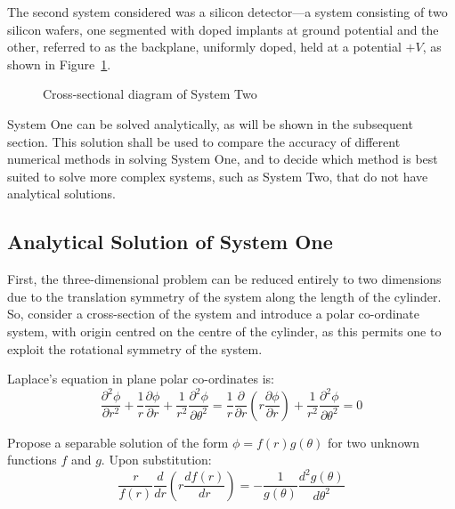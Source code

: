\documentclass[11pt, a4paper]{article}
\newcommand{\be}{\begin{equation}}
\newcommand{\ee}{\end{equation}}
\begin{document}
The second system considered was a silicon detector---a system consisting of two
silicon wafers, one segmented with doped implants at ground potential and the other,
referred to as the backplane, uniformly doped, held at a potential $+V$, as shown
in Figure~\ref{fig:sys two}. 

\begin{figure}[h!]
\begin{center}
\end{center}
\caption{Cross-sectional diagram of System Two}
\label{fig:sys two}
\end{figure}

System One can be solved analytically, as will be shown in the subsequent section. This
solution shall be used to compare the accuracy of different numerical methods in solving
System One, and to decide which method is best suited to solve more complex systems, such
as System Two, that do not have analytical solutions.

\subsection{Analytical Solution of System One}

First, the three-dimensional problem can be reduced entirely to two
dimensions due to the translation symmetry of the system along the length of the
cylinder. So, consider a cross-section of the system and introduce a polar
co-ordinate system, with origin centred on the centre of the cylinder, as this permits
one to exploit the rotational symmetry of the system.

Laplace's equation in plane polar co-ordinates is: 
%
\be
\frac{\partial^2 \phi}{\partial r^2}+\frac{1}{r}\frac{\partial \phi}{\partial r}+\frac{1}{r^2}\frac{\partial^2 \phi}{\partial \theta^2}
= \frac{1}{r}\frac{\partial}{\partial r}(r \frac{\partial \phi}{\partial r}) + \frac{1}{r^2}\frac{\partial ^2 \phi}{\partial \theta^2}
= 0
\ee

Propose a separable solution of the form $\phi = f(r)g(\theta)$ for two unknown
functions $f$ and $g$. Upon substitution:
%
\be
\frac{r}{f(r)}\frac{d}{dr}(r \frac{df(r)}{dr}) =- \frac{1}{g(\theta)}\frac{d^2 g(\theta)}{d\theta^2}
\ee
\end{document}
